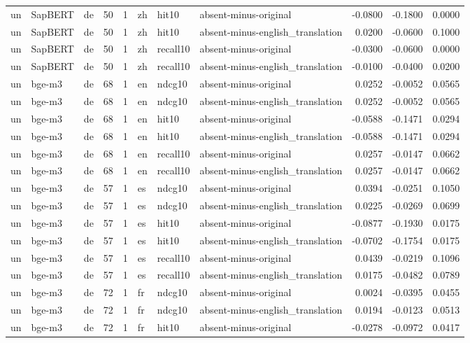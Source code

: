\begin{tabular}{lllrrlllrrr}
un & SapBERT & de & 50 & 1 & zh & hit10 & absent-minus-original & -0.0800 & -0.1800 & 0.0000 \\
un & SapBERT & de & 50 & 1 & zh & hit10 & absent-minus-english\_translation & 0.0200 & -0.0600 & 0.1000 \\
un & SapBERT & de & 50 & 1 & zh & recall10 & absent-minus-original & -0.0300 & -0.0600 & 0.0000 \\
un & SapBERT & de & 50 & 1 & zh & recall10 & absent-minus-english\_translation & -0.0100 & -0.0400 & 0.0200 \\
un & bge-m3 & de & 68 & 1 & en & ndcg10 & absent-minus-original & 0.0252 & -0.0052 & 0.0565 \\
un & bge-m3 & de & 68 & 1 & en & ndcg10 & absent-minus-english\_translation & 0.0252 & -0.0052 & 0.0565 \\
un & bge-m3 & de & 68 & 1 & en & hit10 & absent-minus-original & -0.0588 & -0.1471 & 0.0294 \\
un & bge-m3 & de & 68 & 1 & en & hit10 & absent-minus-english\_translation & -0.0588 & -0.1471 & 0.0294 \\
un & bge-m3 & de & 68 & 1 & en & recall10 & absent-minus-original & 0.0257 & -0.0147 & 0.0662 \\
un & bge-m3 & de & 68 & 1 & en & recall10 & absent-minus-english\_translation & 0.0257 & -0.0147 & 0.0662 \\
un & bge-m3 & de & 57 & 1 & es & ndcg10 & absent-minus-original & 0.0394 & -0.0251 & 0.1050 \\
un & bge-m3 & de & 57 & 1 & es & ndcg10 & absent-minus-english\_translation & 0.0225 & -0.0269 & 0.0699 \\
un & bge-m3 & de & 57 & 1 & es & hit10 & absent-minus-original & -0.0877 & -0.1930 & 0.0175 \\
un & bge-m3 & de & 57 & 1 & es & hit10 & absent-minus-english\_translation & -0.0702 & -0.1754 & 0.0175 \\
un & bge-m3 & de & 57 & 1 & es & recall10 & absent-minus-original & 0.0439 & -0.0219 & 0.1096 \\
un & bge-m3 & de & 57 & 1 & es & recall10 & absent-minus-english\_translation & 0.0175 & -0.0482 & 0.0789 \\
un & bge-m3 & de & 72 & 1 & fr & ndcg10 & absent-minus-original & 0.0024 & -0.0395 & 0.0455 \\
un & bge-m3 & de & 72 & 1 & fr & ndcg10 & absent-minus-english\_translation & 0.0194 & -0.0123 & 0.0513 \\
un & bge-m3 & de & 72 & 1 & fr & hit10 & absent-minus-original & -0.0278 & -0.0972 & 0.0417 \\

\end{tabular}
